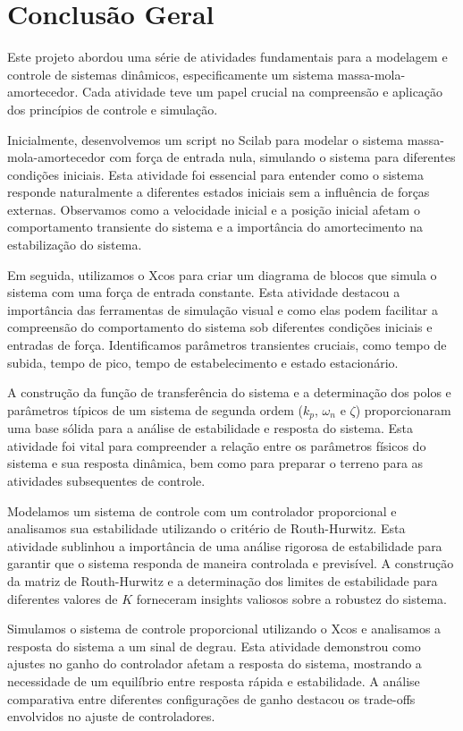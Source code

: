 \section{Conclusão Geral}

Este projeto abordou uma série de atividades fundamentais para a modelagem e controle de sistemas dinâmicos, especificamente um sistema massa-mola-amortecedor. Cada atividade teve um papel crucial na compreensão e aplicação dos princípios de controle e simulação.

Inicialmente, desenvolvemos um script no Scilab para modelar o sistema massa-mola-amortecedor com força de entrada nula, simulando o sistema para diferentes condições iniciais. Esta atividade foi essencial para entender como o sistema responde naturalmente a diferentes estados iniciais sem a influência de forças externas. Observamos como a velocidade inicial e a posição inicial afetam o comportamento transiente do sistema e a importância do amortecimento na estabilização do sistema.

Em seguida, utilizamos o Xcos para criar um diagrama de blocos que simula o sistema com uma força de entrada constante. Esta atividade destacou a importância das ferramentas de simulação visual e como elas podem facilitar a compreensão do comportamento do sistema sob diferentes condições iniciais e entradas de força. Identificamos parâmetros transientes cruciais, como tempo de subida, tempo de pico, tempo de estabelecimento e estado estacionário.

A construção da função de transferência do sistema e a determinação dos polos e parâmetros típicos de um sistema de segunda ordem (\(k_p\), \(\omega_n\) e \(\zeta\)) proporcionaram uma base sólida para a análise de estabilidade e resposta do sistema. Esta atividade foi vital para compreender a relação entre os parâmetros físicos do sistema e sua resposta dinâmica, bem como para preparar o terreno para as atividades subsequentes de controle.

Modelamos um sistema de controle com um controlador proporcional e analisamos sua estabilidade utilizando o critério de Routh-Hurwitz. Esta atividade sublinhou a importância de uma análise rigorosa de estabilidade para garantir que o sistema responda de maneira controlada e previsível. A construção da matriz de Routh-Hurwitz e a determinação dos limites de estabilidade para diferentes valores de \(K\) forneceram insights valiosos sobre a robustez do sistema.

Simulamos o sistema de controle proporcional utilizando o Xcos e analisamos a resposta do sistema a um sinal de degrau. Esta atividade demonstrou como ajustes no ganho do controlador afetam a resposta do sistema, mostrando a necessidade de um equilíbrio entre resposta rápida e estabilidade. A análise comparativa entre diferentes configurações de ganho destacou os trade-offs envolvidos no ajuste de controladores.

